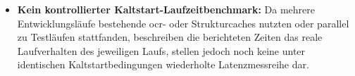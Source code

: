 \begin{itemize}
  \item \textbf{Kein kontrollierter Kaltstart-Laufzeitbenchmark:} Da mehrere Entwicklungsläufe bestehende \ac{ocr}- oder Strukturcaches nutzten oder parallel zu Testläufen stattfanden, beschreiben die berichteten Zeiten das reale Laufverhalten des jeweiligen Laufs, stellen jedoch noch keine unter identischen Kaltstartbedingungen wiederholte Latenzmessreihe dar.
\end{itemize}
